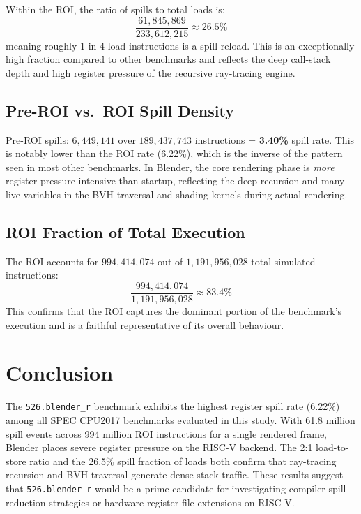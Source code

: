 \documentclass[conference]{IEEEtran}
\begin{document}
Within the ROI, the ratio of spills to total loads is:
\[
\frac{61{,}845{,}869}{233{,}612{,}215} \approx 26.5\%
\]
meaning roughly 1 in 4 load instructions is a spill reload.
This is an exceptionally high fraction compared to other
benchmarks and reflects the deep call-stack depth and high
register pressure of the recursive ray-tracing engine.

\subsection{Pre-ROI vs.\ ROI Spill Density}

Pre-ROI spills: $6{,}449{,}141$ over $189{,}437{,}743$ instructions
= \textbf{3.40\%} spill rate. This is notably lower than the ROI
rate (6.22\%), which is the inverse of the pattern seen in most
other benchmarks. In Blender, the core rendering phase is
\emph{more} register-pressure-intensive than startup, reflecting
the deep recursion and many live variables in the BVH traversal
and shading kernels during actual rendering.

\subsection{ROI Fraction of Total Execution}

The ROI accounts for $994{,}414{,}074$ out of $1{,}191{,}956{,}028$
total simulated instructions:
\[
\frac{994{,}414{,}074}{1{,}191{,}956{,}028} \approx 83.4\%
\]
This confirms that the ROI captures the dominant portion of the
benchmark's execution and is a faithful representative of its
overall behaviour.

\section{Conclusion}

The \texttt{526.blender\_r} benchmark exhibits the highest register
spill rate (6.22\%) among all SPEC CPU2017 benchmarks evaluated in
this study. With 61.8 million spill events across 994 million ROI
instructions for a single rendered frame, Blender places severe
register pressure on the RISC-V backend. The 2:1 load-to-store ratio
and the 26.5\% spill fraction of loads both confirm that ray-tracing
recursion and BVH traversal generate dense stack traffic. These
results suggest that \texttt{526.blender\_r} would be a prime
candidate for investigating compiler spill-reduction strategies or
hardware register-file extensions on RISC-V.
\end{document}
